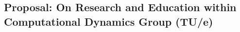 \hypertarget{proposal-on-research-and-education-within-computational-dynamics-group-tue}{%
\subsection{Proposal: On Research and Education within Computational
Dynamics Group
(TU/e)}\label{proposal-on-research-and-education-within-computational-dynamics-group-tue}}
